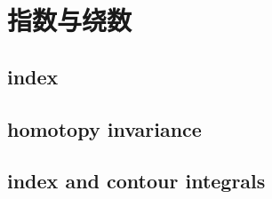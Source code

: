 \section{指数与绕数}
\label{b3:sec:1001}


\subsection{index}
\label{b3:subsec:100101}

\subsection{homotopy invariance}
\label{b3:subsec:100102}

\subsection{index and contour integrals}
\label{b3:subsec:100103}



